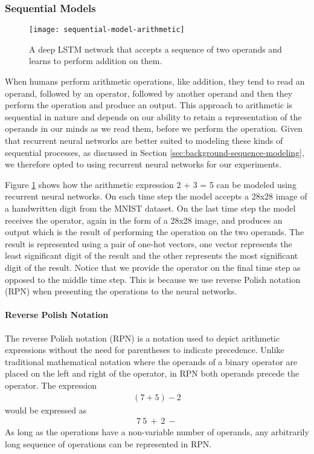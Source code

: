 \subsubsection{Sequential Models} \label{sec:theory-approach-methodology-sequential-models}

\begin{figure}[t]
	\centering
	\texttt{[image: sequential-model-arithmetic]}
	\caption{A deep LSTM network that accepts a sequence of two operands and learns to perform addition on them.}
	\label{fig:sequential-model-arithmetic}
\end{figure}

When humans perform arithmetic operations, like addition, they tend to read an operand, followed by an operator, followed by another operand and then they perform the operation and produce an output. This approach to arithmetic is sequential in nature and depends on our ability to retain a representation of the operands in our minds as we read them, before we perform the operation. Given that recurrent neural networks are better suited to modeling these kinds of sequential processes, as discussed in Section \ref{sec:background-sequence-modeling}, we therefore opted to using recurrent neural networks for our experiments.

Figure \ref{fig:sequential-model-arithmetic} shows how the arithmetic expression 2 + 3 = 5 can be modeled using recurrent neural networks. On each time step the model accepts a 28x28 image of a handwritten digit from the MNIST dataset. On the last time step the model receives the operator, again in the form of a 28x28 image, and produces an output which is the result of performing the operation on the two operands. The result is represented using a pair of one-hot vectors, one vector represents the least significant digit of the result and the other represents the most significant digit of the result. Notice that we provide the operator on the final time step as opposed to the middle time step. This is because we use reverse Polish notation (RPN) when presenting the operations to the neural networks.

\paragraph{Reverse Polish Notation}

The reverse Polish notation (RPN) is a notation used to depict arithmetic expressions without the need for parentheses to indicate precedence. Unlike traditional mathematical notation where the operands of a binary operator are placed on the left and right of the operator, in RPN both operands precede the operator. The expression
\begin{gather*}
	(7 + 5) - 2
\end{gather*}
would be expressed as
\begin{gather*}
	7\ 5\ +\ 2\ -
\end{gather*}
As long as the operations have a non-variable number of operands, any arbitrarily long sequence of operations can be represented in RPN\cite{wiki:reverse-polish-notation}.

